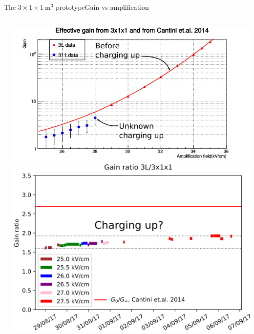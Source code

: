 \documentclass[10pt]{beamer}
\begin{document}
\begin{frame}{The \texorpdfstring{$3 \times 1 \times \SI{1}{\meter\cubed}$}{311} prototype}{Gain vs amplification}
\begin{scriptsize}
\begin{columns}
\begin{column}{0.5\textwidth}
	    		\end{column}
	    		\hfill
	    		\begin{column}{0.5\textwidth}
	    			\centering
	    			\includegraphics[width=\textwidth]{figures/311/gain.png}\\
	    			\includegraphics[width=.95\textwidth]{figures/311/ratio_vs_time.png}\\
	    		\end{column}
	    	\end{columns}
    	\end{scriptsize}
    \end{frame}
    
\end{document}
